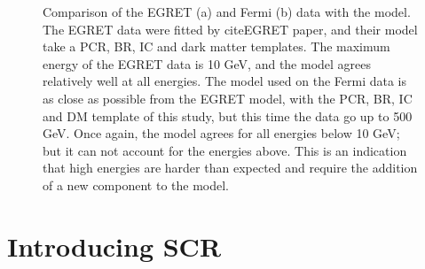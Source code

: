 \begin{figure}[h]
  \caption[Comparison of EGRET and Fermi results]{Comparison of the EGRET (a) and Fermi (b) data with the model. The EGRET data were fitted by cite{EGRET paper}, and their model take a PCR, BR, IC and dark matter templates. The maximum energy of the EGRET data is 10 GeV, and the model agrees relatively well at all energies. The model used on the Fermi data is as close as possible from the EGRET model, with the PCR, BR, IC and DM template of this study, but this time the data go up to 500 GeV. Once again, the model agrees for all energies below 10 GeV; but it can not account for the energies above. This is an indication that high energies are harder than expected and require the addition of a new component to the model.}
  \label{fig:EGRET_comp}
\end{figure}


\newpage
\section{Introducing SCR}

